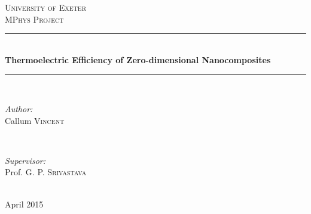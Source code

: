 \begin{titlepage}
\center
\textsc{\LARGE University of Exeter}\\[1.5cm]
\textsc{\Large MPhys Project}\\[0.5cm]

\rule{\linewidth}{0.5mm} \\[0.4cm]
{\huge \bfseries Thermoelectric Efficiency of Zero-dimensional Nanocomposites}\\[0.4cm]
\rule{\linewidth}{0.5mm} \\[1.5cm]
 
\begin{minipage}{0.4\textwidth}
\begin{flushleft} \large
\emph{Author:}\\
Callum \textsc{Vincent}
\end{flushleft}
\end{minipage}
~
\begin{minipage}{0.4\textwidth}
\begin{flushright} \large
\emph{Supervisor:} \\
Prof. G. P. \textsc{Srivastava}
\end{flushright}
\end{minipage}\\[4cm]


{\large April 2015}\\[3cm]


\end{titlepage}